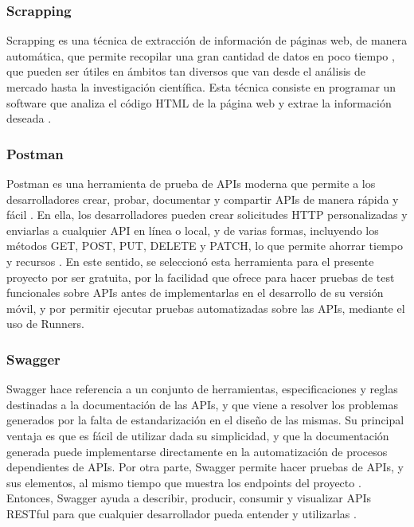 \subsubsection{Scrapping}
Scrapping es una técnica de extracción de información de páginas web, de manera automática, que permite recopilar una gran cantidad de datos en poco tiempo \cite{book:rusell}, que pueden ser útiles en ámbitos tan diversos que van desde el análisis de mercado hasta la investigación científica. Esta técnica consiste en programar un software que analiza el código HTML de la página web y extrae la información deseada \cite{book:rusell}.

\subsubsection{Postman}
Postman es una herramienta de prueba de APIs moderna que permite a los desarrolladores crear, probar, documentar y compartir APIs de manera rápida y fácil \cite{art:bhattacharya}. En ella, los desarrolladores pueden crear solicitudes HTTP personalizadas y enviarlas a cualquier API en línea o local, y de varias formas, incluyendo los métodos GET, POST, PUT, DELETE y PATCH, lo que permite ahorrar tiempo y recursos \cite{art:chatterjee}. En este sentido, se seleccionó esta herramienta para el presente proyecto por ser gratuita, por la facilidad que ofrece para hacer pruebas de test funcionales sobre APIs antes de implementarlas en el desarrollo de su versión móvil, y por permitir ejecutar pruebas automatizadas sobre las APIs, mediante el uso de Runners.

\subsubsection{Swagger}
Swagger hace referencia a un conjunto de herramientas, especificaciones y reglas destinadas a la documentación de las APIs, y que viene a resolver los problemas generados por la falta de estandarización en el diseño de las mismas. Su principal ventaja es que es fácil de utilizar dada su simplicidad, y que la documentación generada puede implementarse directamente en la automatización de procesos dependientes de APIs. Por otra parte, Swagger permite hacer pruebas de APIs, y sus elementos, al mismo tiempo que muestra los endpoints del proyecto \cite{art:swagger_lopez}. Entonces, Swagger ayuda a describir, producir, consumir y visualizar APIs RESTful para que cualquier desarrollador pueda entender y utilizarlas \cite{art:swagger_rodriguez}.

